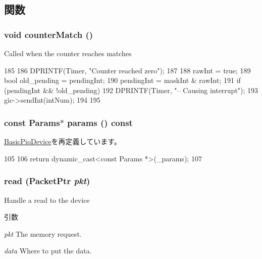 \subsection{関数}
\hypertarget{classPL031_a03ecb5b0aa40b2ad3821439cd5e01dcd}{
\subsubsection[{counterMatch}]{\setlength{\rightskip}{0pt plus 5cm}void counterMatch ()}}
\label{classPL031_a03ecb5b0aa40b2ad3821439cd5e01dcd}
Called when the counter reaches matches 


\begin{DoxyCode}
185 {
186     DPRINTF(Timer, "Counter reached zero\n");
187 
188     rawInt = true;
189     bool old_pending = pendingInt;
190     pendingInt = maskInt & rawInt;
191     if (pendingInt && !old_pending) {
192         DPRINTF(Timer, "-- Causing interrupt\n");
193         gic->sendInt(intNum);
194     }
195 }
\end{DoxyCode}
\hypertarget{classPL031_acd3c3feb78ae7a8f88fe0f110a718dff}{
\subsubsection[{params}]{\setlength{\rightskip}{0pt plus 5cm}const {\bf Params}$\ast$ params () const}}
\label{classPL031_acd3c3feb78ae7a8f88fe0f110a718dff}


\hyperlink{classBasicPioDevice_acd3c3feb78ae7a8f88fe0f110a718dff}{BasicPioDevice}を再定義しています。


\begin{DoxyCode}
105     {
106         return dynamic_cast<const Params *>(_params);
107     }
\end{DoxyCode}
\hypertarget{classPL031_a613ec7d5e1ec64f8d21fec78ae8e568e}{
\subsubsection[{read}]{ read ({\bf PacketPtr} {\em pkt})}}
\label{classPL031_a613ec7d5e1ec64f8d21fec78ae8e568e}
Handle a read to the device 
\begin{DoxyParams}{引数}
\item[{\em pkt}]The memory request. \item[{\em data}]Where to put the data. \end{DoxyParams}


